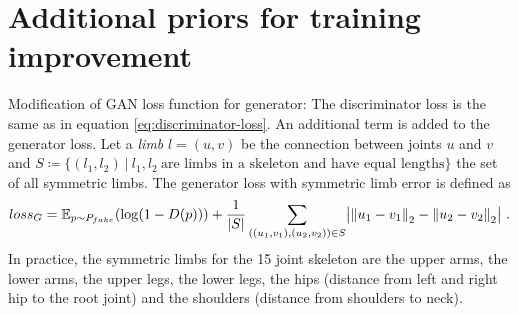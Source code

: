 \section{Additional priors for training improvement}


Modification of GAN loss function for generator:
The discriminator loss is the same as in equation \ref{eq:discriminator-loss}. An additional term is added to the generator loss. Let a \textit{limb} $l = (u, v)$ be the connection between joints $u$ and $v$ and $S \coloneqq \{(l_1, l_2)~|~ l_1, l_2~\text{are limbs in a skeleton and have equal lengths}\}$ the set of all symmetric limbs. The generator loss with symmetric limb error is defined as 
\begin{equation}
	loss_G = \mathbb{E}_{p\sim P_{fake}}(\log(1 - D(p))) 
	+ \frac{1}{|S|}\sum_{((u_1, v_1), (u_2, v_2)) \in S} \bigl\lvert \norm{u_1 - v_1}_2 - \norm{u_2 - v_2}_2 \bigr\rvert \ .
\end{equation}
In practice, the symmetric limbs for the 15 joint skeleton are the upper arms, the lower arms, the upper legs, the lower legs, the hips (distance from left and right hip to the root joint) and the shoulders (distance from shoulders to neck).